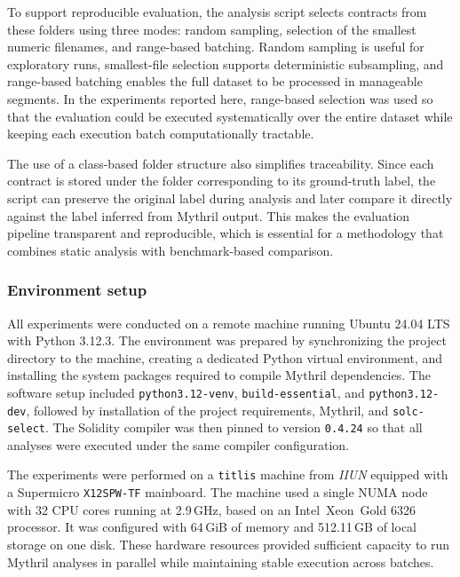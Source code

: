 \documentclass[a4paper,11pt]{article}\usepackage{graphicx} %
\begin{document}
To support reproducible evaluation, the analysis script selects contracts from these folders using three modes: random sampling, selection of the smallest numeric filenames, and range-based batching. Random sampling is useful for exploratory runs, smallest-file selection supports deterministic subsampling, and range-based batching enables the full dataset to be processed in manageable segments. In the experiments reported here, range-based selection was used so that the evaluation could be executed systematically over the entire dataset while keeping each execution batch computationally tractable.

The use of a class-based folder structure also simplifies traceability. Since each contract is stored under the folder corresponding to its ground-truth label, the script can preserve the original label during analysis and later compare it directly against the label inferred from Mythril output. This makes the evaluation pipeline transparent and reproducible, which is essential for a methodology that combines static analysis with benchmark-based comparison.

\subsubsection{Environment setup}

All experiments were conducted on a remote machine running Ubuntu 24.04 LTS with Python 3.12.3. The environment was prepared by synchronizing the project directory to the machine, creating a dedicated Python virtual environment, and installing the system packages required to compile Mythril dependencies. The software setup included \texttt{python3.12-venv}, \texttt{build-essential}, and \texttt{python3.12-dev}, followed by installation of the project requirements, Mythril, and \texttt{solc-select}. The Solidity compiler was then pinned to version \texttt{0.4.24} so that all analyses were executed under the same compiler configuration.

The experiments were performed on a \texttt{titlis} machine from \textit{IIUN} \cite{noauthor_machines_nodate} equipped with a Supermicro \texttt{X12SPW-TF} mainboard. The machine used a single NUMA node with 32 CPU cores running at 2.9\,GHz, based on an Intel\textregistered\ Xeon\textregistered\ Gold 6326 processor. It was configured with 64\,GiB of memory and 512.11\,GB of local storage on one disk. These hardware resources provided sufficient capacity to run Mythril analyses in parallel while maintaining stable execution across batches.
\end{document}
